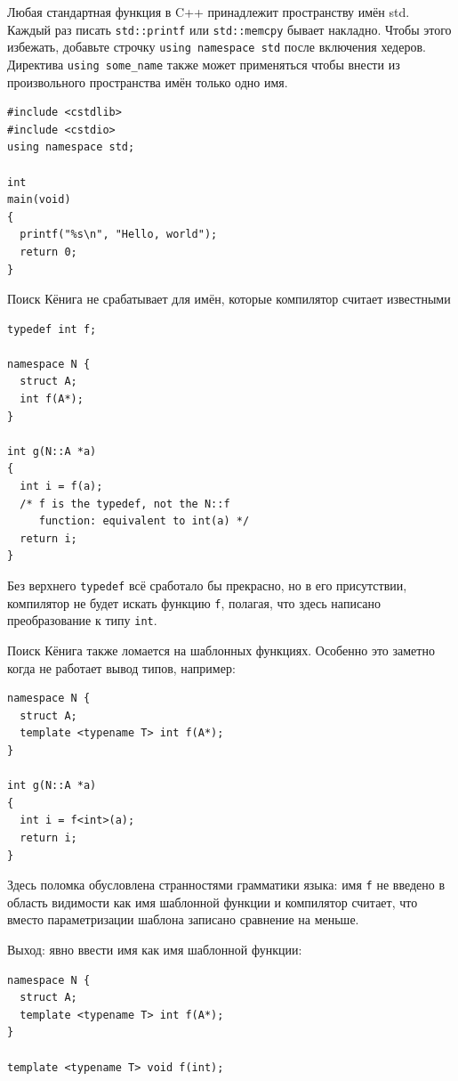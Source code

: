 \documentclass[a4paper,12pt,oneside]{article}
\begin{document}
Любая стандартная функция в C++ принадлежит пространству имён std. Каждый раз писать \lstinline!std::printf! или \lstinline!std::memcpy! бывает накладно. Чтобы этого избежать, добавьте строчку \lstinline!using namespace std! после включения хедеров. Директива \lstinline!using some_name! также может применяться чтобы внести из произвольного пространства имён только одно имя.

\begin{lstlisting}
#include <cstdlib>
#include <cstdio>
using namespace std;

int 
main(void)
{
  printf("%s\n", "Hello, world");
  return 0;
}
\end{lstlisting}

Поиск Кёнига не срабатывает для имён, которые компилятор считает известными

\begin{lstlisting}
typedef int f;

namespace N {
  struct A;
  int f(A*);
}

int g(N::A *a)
{
  int i = f(a);
  /* f is the typedef, not the N::f
     function: equivalent to int(a) */
  return i;
}
\end{lstlisting}

Без верхнего \lstinline!typedef! всё сработало бы прекрасно, но в его присутствии, компилятор не будет искать функцию \lstinline!f!, полагая, что здесь написано преобразование к типу \lstinline!int!.

Поиск Кёнига также ломается на шаблонных функциях. Особенно это заметно когда не работает вывод типов, например:

\begin{lstlisting}
namespace N {
  struct A;
  template <typename T> int f(A*);
}

int g(N::A *a)
{
  int i = f<int>(a);
  return i;
}
\end{lstlisting}

Здесь поломка обусловлена странностями грамматики языка: имя \lstinline!f! не введено в область видимости как имя шаблонной функции и компилятор считает, что вместо параметризации шаблона записано сравнение на меньше.

Выход: явно ввести имя как имя шаблонной функции:

\begin{lstlisting}
namespace N {
  struct A;
  template <typename T> int f(A*);
}

template <typename T> void f(int);
\end{lstlisting}
\end{document}

